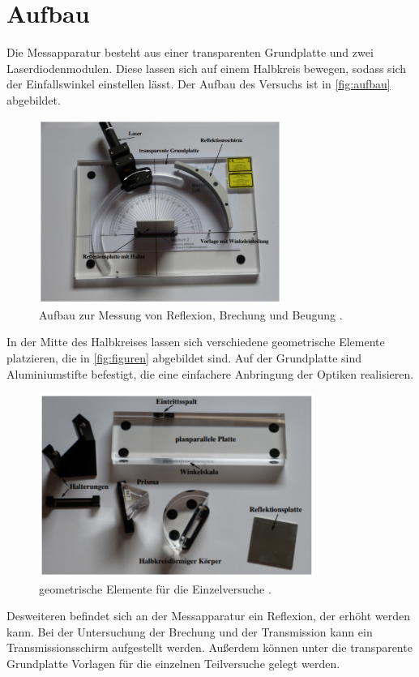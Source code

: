 \section{Aufbau}
\label{sec:Aufbau}

Die Messapparatur besteht aus einer transparenten Grundplatte und zwei Laserdiodenmodulen.
Diese lassen sich auf einem Halbkreis bewegen, sodass sich der Einfallswinkel einstellen
lässt. Der Aufbau des Versuchs ist in \autoref{fig:aufbau} abgebildet. 

\begin{figure}
    \centering
    \includegraphics[height = 6cm]{Aufbau.pdf}
    \caption{Aufbau zur Messung von Reflexion, Brechung und Beugung \cite{ap400}.}
    \label{fig:aufbau}
\end{figure}

In der Mitte des Halbkreises lassen sich verschiedene geometrische Elemente platzieren,
die in \autoref{fig:figuren} abgebildet sind. Auf der Grundplatte sind Aluminiumstifte
befestigt, die eine einfachere Anbringung der Optiken realisieren.

\begin{figure}
    \centering
    \includegraphics[height = 6cm]{Teile.pdf}
    \caption{geometrische Elemente für die Einzelversuche \cite{ap400}.}
    \label{fig:figuren}
\end{figure}

Desweiteren befindet sich an der Messapparatur ein Reflexion, der erhöht werden kann.
Bei der Untersuchung der Brechung und der Transmission kann ein Transmissionsschirm 
aufgestellt werden. Außerdem können unter die transparente Grundplatte Vorlagen für
die einzelnen Teilversuche gelegt werden.
